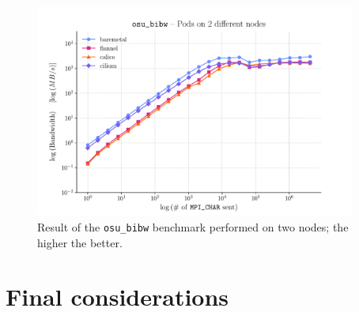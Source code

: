
\begin{figure}[H]
  \centering
  \includegraphics[width=0.94\textwidth]{img/chpt3/bibw-2-nodes}
  \caption{Result of the \texttt{osu\_bibw} benchmark performed on two nodes; the
    higher the better.}
  \label{fig:bibw-2-nodes}
\end{figure}

\section{Final considerations}\label{sec:final-considerations}


